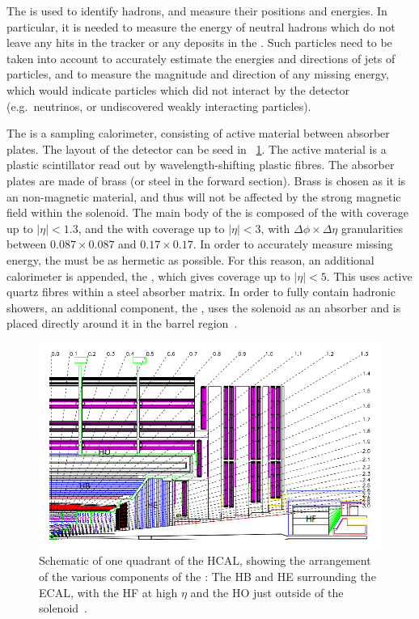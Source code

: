 The \HCAL is used to identify hadrons, and measure their positions and energies. In particular, it is needed to measure the energy of neutral hadrons which do not leave any hits in the tracker or any deposits in the \ECAL. Such particles need to be taken into account to accurately estimate the energies and directions of jets of particles, and to measure the magnitude and direction of any missing energy, which would indicate particles which did not interact by the \CMS detector (e.g.~neutrinos, or undiscovered weakly interacting particles). 

The \CMS \HCAL is a sampling calorimeter, consisting of active material between absorber plates. The layout of the detector can be seed in \Fig~\ref{fig:hcal}. The active material is a plastic scintillator read out by wavelength-shifting plastic fibres. The absorber plates are made of brass (or steel in the forward section). Brass is chosen as it is an non-magnetic material, and thus will not be affected by the strong magnetic field within the solenoid. The main body of the \HCAL is composed of the \HB with coverage up to $|\eta| < 1.3$, and the \HE with coverage up to $|\eta| < 3$, with $\Delta\phi \times \Delta\eta$ granularities between $0.087 \times 0.087$ and $ 0.17 \times 0.17$. In order to accurately measure missing energy, the \HCAL must be as hermetic as possible. For this reason, an additional calorimeter is appended, the \HF, which gives coverage up to $|\eta| <5$. This uses active quartz fibres within a steel absorber matrix. In order to fully contain hadronic showers, an additional component, the \HO, uses the solenoid as an absorber and is placed directly around it in the barrel region~\cite{cmsHcal}. 

\begin{figure}[h]
\centering
\includegraphics[width=1.0\textwidth]{detectorFigures/cms_hcal.png}
\caption[Schematic \crosssection of one quadrant of the HCAL, showing the arrangement of the various components of the \subdetector: The HB and HE surrounding the ECAL, with the HF at high $\eta$ and the HO just outside of the solenoid\quad\cite{CMSatLHC}.]{Schematic \crosssection of one quadrant of the HCAL, showing the arrangement of the various components of the \subdetector: The HB and HE surrounding the ECAL, with the HF at high $\eta$ and the HO just outside of the solenoid~\cite{CMSatLHC}.}
\label{fig:hcal}
\end{figure}


